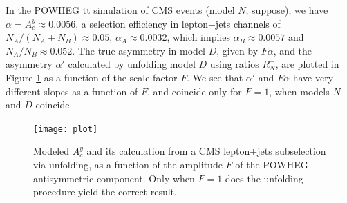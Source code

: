 \documentclass[letterpaper,11pt]{article}
\begin{document}
In the {\sc POWHEG} $\mathrm{t\bar{t}}$ simulation of CMS events
(model $N$, suppose), we have $\alpha=A_c^y\approx0.0056$, a selection
efficiency in lepton+jets channels of $N_A/(N_A+N_B)\approx 0.05$,
$\alpha_A\approx0.0032$, which implies $\alpha_B\approx0.0057$ and
$N_A/N_B\approx0.052$.  The true asymmetry in model $D$, given by
$F\alpha$, and the asymmetry $\alpha'$ calculated by unfolding model
$D$ using ratios $R_N^\pm$, are plotted in Figure \ref{plot} as a
function of the scale factor $F$.  We see that $\alpha'$ and $F\alpha$
have very different slopes as a function of $F$, and coincide only for
$F=1$, when models $N$ and $D$ coincide.
\begin{figure}
  \centering
  \texttt{[image: plot]}
  \caption{\label{plot} Modeled $A_c^y$ and its calculation from a CMS
    lepton+jets subselection via unfolding, as a function of the
    amplitude $F$ of the {\sc POWHEG} antisymmetric component.  Only
    when $F=1$ does the unfolding procedure yield the correct result.}
\end{figure}
\end{document}

